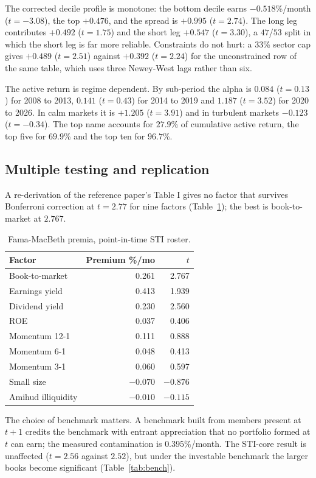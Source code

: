 \documentclass[11pt,a4paper]{article}
\begin{document}
The corrected decile profile is monotone: the bottom decile earns $-0.518$\%/month ($t=-3.08$), the top $+0.476$, and the spread is $+0.995$ ($t=2.74$). The long leg contributes $+0.492$ ($t=1.75$) and the short leg $+0.547$ ($t=3.30$), a $47$/$53$ split in which the short leg is far more reliable. Constraints do not hurt: a $33$\% sector cap gives $+0.489$ ($t=2.51$) against $+0.392$ ($t=2.24$) for the unconstrained row of the same table, which uses three Newey-West lags rather than six.

The active return is regime dependent. By sub-period the alpha is $0.084$ ($t=0.13$) for 2008 to 2013, $0.141$ ($t=0.43$) for 2014 to 2019 and $1.187$ ($t=3.52$) for 2020 to 2026. In calm markets it is $+1.205$ ($t=3.91$) and in turbulent markets $-0.123$ ($t=-0.34$). The top name accounts for $27.9$\% of cumulative active return, the top five for $69.9$\% and the top ten for $96.7$\%.

\subsection{Multiple testing and replication}
A re-derivation of the reference paper's Table I gives no factor that survives Bonferroni correction at $t=2.77$ for nine factors (Table~\ref{tab:ref}); the best is book-to-market at $2.767$.

\begin{table}[h]
\centering
\caption{Fama-MacBeth premia, point-in-time STI roster.}
\label{tab:ref}
\begin{tabular}{lrr}
\toprule
Factor & Premium \%/mo & $t$ \\
\midrule
Book-to-market & 0.261 & 2.767 \\
Earnings yield & 0.413 & 1.939 \\
Dividend yield & 0.230 & 2.560 \\
ROE & 0.037 & 0.406 \\
Momentum 12-1 & 0.111 & 0.888 \\
Momentum 6-1 & 0.048 & 0.413 \\
Momentum 3-1 & 0.060 & 0.597 \\
Small size & $-0.070$ & $-0.876$ \\
Amihud illiquidity & $-0.010$ & $-0.115$ \\
\bottomrule
\end{tabular}
\end{table}

The choice of benchmark matters. A benchmark built from members present at $t+1$ credits the benchmark with entrant appreciation that no portfolio formed at $t$ can earn; the measured contamination is $0.395$\%/month. The STI-core result is unaffected ($t=2.56$ against $2.52$), but under the investable benchmark the larger books become significant (Table~\ref{tab:bench}).
\end{document}
